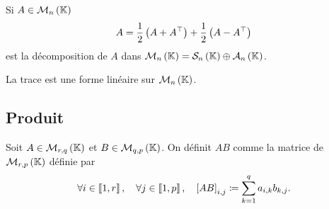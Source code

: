 \documentclass{magnolia}
\begin{document}
\begin{remarqueUnique}
\remarque Si $A\in\mathcal{M}_{n}\left(\mathbb{K}\right)$
  \[A=\frac{1}{2}\left(A+{A}^{\top}\right)+\frac{1}{2}\left(A-{A}^{\top}\right)\]
  est la décomposition de $A$ dans
  $\mathcal{M}_{n}\left(\mathbb{K}\right)=\mathcal{S}_n\left(\mathbb{K}\right)\oplus\mathcal{A}_n\left(\mathbb{K}\right)$.
\end{remarqueUnique}

\begin{proposition}[utile=-3]
La trace est une forme linéaire sur $\mathcal{M}_{n}\left(\mathbb{K}\right)$.
\end{proposition}

\subsection{Produit}

\begin{definition}
Soit $A\in\mathcal{M}_{r,q}\left(\mathbb{K}\right)$ et $B\in\mathcal{M}_{q,p}\left(\mathbb{K}\right)$. On définit $AB$
comme la matrice de $\mathcal{M}_{r,p}\left(\mathbb{K}\right)$ définie par
\[\forall i\in\left\llbracket 1,r\right\rrbracket ,\quad \forall j\in\left\llbracket 1,p\right\rrbracket ,\quad
  \left[AB\right]_{i,j}\coloneqq\sum_{k=1}^q a_{i,k}b_{k,j}.\]
\end{definition}
\end{document}
